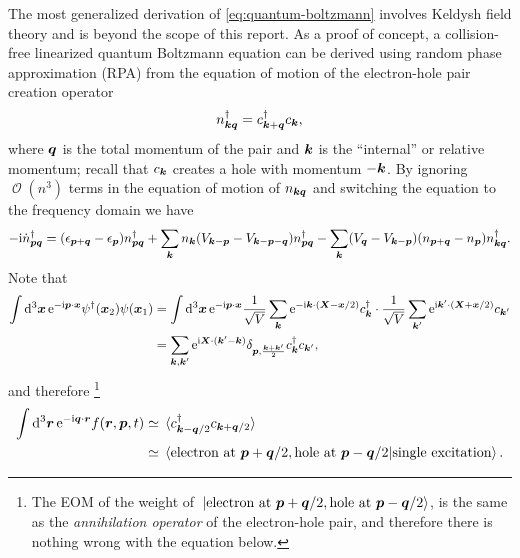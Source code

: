 \documentclass[hyperref, a4paper]{article}
\newcommand*{\ii}{\mathrm{i}}
\newcommand*{\ee}{\mathrm{e}}
\DeclareMathOperator{\bigO}{\mathcal{O}}
\begin{document}
The most generalized derivation of \eqref{eq:quantum-boltzmann} 
involves Keldysh field theory 
\cite{RevModPhys.58.323}
and is beyond the scope of this report.
As a proof of concept,
a collision-free linearized quantum Boltzmann equation can be derived 
using random phase approximation (RPA) 
from the equation of motion of the electron-hole pair creation operator
\begin{equation}
    n_{\vb*{k} \vb*{q}}^\dagger = c^\dagger_{\vb*{k} + \vb*{q}} c_{\vb*{k}},
\end{equation}
where $\vb*{q}$ is the total momentum of the pair 
and $\vb*{k}$ is the ``internal'' or relative momentum;
recall that $c_{\vb*{k}}$ creates a hole with momentum $- \vb*{k}$.
By ignoring $\bigO(n^3)$ terms in the equation of motion of $n_{\vb*{k} \vb*{q}}$
and switching the equation to the frequency domain
we have \cite{pines2018theory}
\begin{equation}
    - \ii \dot{n}_{\vb*{p} \vb*{q}}^\dagger
    = (\epsilon_{\vb*{p} + \vb*{q}} - \epsilon_{\vb*{p}}) n^\dagger_{\vb*{p} \vb*{q}}
    + \sum_{\vb*{k}} n_{\vb*{k}} (V_{\vb*{k} - \vb*{p}} - V_{\vb*{k} - \vb*{p} - \vb*{q}}) n^\dagger_{\vb*{p} \vb*{q}}
    - \sum_{\vb*{k}} (V_{\vb*{q}} - V_{\vb*{k} - \vb*{p}})
    (n_{\vb*{p} + \vb*{q}} - n_{\vb*{p}})
    n^\dagger_{\vb*{k} \vb*{q}}.
    \label{eq:eom-density}
\end{equation}
Note that 
\begin{equation}
    \begin{aligned}
        \int \dd[3]{\vb*{x}} \ee^{- \ii \vb*{p} \cdot \vb*{x}} \psi^\dagger(\vb*{x}_2) \psi(\vb*{x}_1) 
        &= \int \dd[3]{\vb*{x}} \ee^{- \ii \vb*{p} \cdot \vb*{x}}
        \frac{1}{\sqrt{V}} \sum_{\vb*{k}} \ee^{- \ii \vb*{k} \cdot (\vb*{X} - \vb*{x} /2 )} c_{\vb*{k}}^\dagger
        \cdot \frac{1}{\sqrt{V}} \sum_{\vb*{k}'} \ee^{\ii \vb*{k}' \cdot (\vb*{X} + \vb*{x} / 2)} c_{\vb*{k}'} \\
        &= \sum_{\vb*{k}, \vb*{k}'} \ee^{\ii \vb*{X} \cdot (\vb*{k}' - \vb*{k})}
        \delta_{\vb*{p}, \frac{\vb*{k} + \vb*{k}'}{2}} c^\dagger_{\vb*{k}} c_{\vb*{k}'},
    \end{aligned}
\end{equation}
and therefore%
\footnote{
    The EOM of the weight of 
    $\ket*{\text{electron at $\vb*{p} + \vb*{q} / 2$}, \text{hole at $\vb*{p} - \vb*{q} / 2$}}$,
    is the same as 
    the \emph{annihilation operator} of the electron-hole pair,
    and therefore there is nothing wrong with the equation below.
}
\begin{equation}
    \begin{aligned}
        \int \dd[3]{\vb*{r}} \ee^{- \ii \vb*{q} \cdot \vb*{r}} f(\vb*{r}, \vb*{p}, t)
        &\simeq \expval*{c^\dagger_{\vb*{k} - \vb*{q} / 2} c_{\vb*{k} + \vb*{q} / 2}} \\
        &\simeq \braket*{\text{electron at $\vb*{p} + \vb*{q} / 2$}, \text{hole at $\vb*{p} - \vb*{q} / 2$}}{\text{single excitation}} .
    \end{aligned}
\end{equation}
\end{document}
